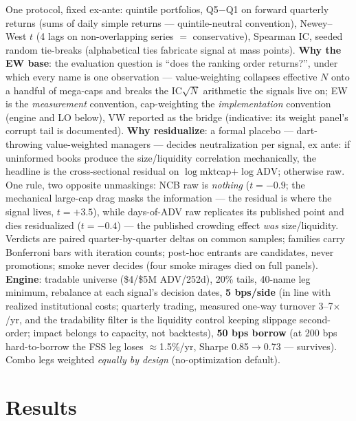 \documentclass[10pt]{article}
\begin{document}
One protocol, fixed ex-ante: quintile portfolios, Q5$-$Q1 on forward
quarterly returns (sums of daily simple returns ---
quintile-neutral convention), Newey--West $t$ (4 lags on
non-overlapping series $=$ conservative), Spearman IC, seeded random
tie-breaks (alphabetical ties fabricate signal at mass points).
\textbf{Why the EW base}: the evaluation question is ``does the
ranking order returns?'', under which every name is one observation
--- value-weighting collapses effective $N$ onto a handful of
mega-caps and breaks the $\mathrm{IC}\sqrt{N}$ arithmetic the
signals live on; EW is the \emph{measurement} convention,
cap-weighting the \emph{implementation} convention (engine and LO
below), VW reported as the bridge (indicative: its weight panel's
corrupt tail is documented). \textbf{Why residualize}: a formal
placebo --- dart-throwing value-weighted managers --- decides
neutralization per signal, ex ante: if uninformed books produce the
size/liquidity correlation mechanically, the headline is the
cross-sectional residual on $\log$mktcap$+\log$ADV; otherwise raw.
One rule, two opposite unmaskings: NCB raw is \emph{nothing}
($t=-0.9$; the mechanical large-cap drag masks the information ---
the residual is where the signal lives, $t=+3.5$), while days-of-ADV
raw replicates its published point and dies residualized ($t=-0.4$)
--- the published crowding effect \emph{was} size/liquidity.
Verdicts are paired quarter-by-quarter deltas on common samples;
families carry Bonferroni bars with iteration counts; post-hoc
entrants are candidates, never promotions; smoke never decides (four
smoke mirages died on full panels). \textbf{Engine}: tradable universe
(\$4/\$5M ADV/252d), 20\% tails, 40-name leg minimum, rebalance at
each signal's decision dates, \textbf{5 bps/side} (in line with
realized institutional costs; quarterly trading, measured one-way
turnover 3--7$\times$/yr, and the tradability filter is the
liquidity control keeping slippage second-order; impact belongs to
capacity, not backtests), \textbf{50 bps borrow} (at 200 bps
hard-to-borrow the FSS leg loses $\approx$1.5\%/yr, Sharpe
0.85$\to$0.73 --- survives). Combo legs weighted \emph{equally by
design} (no-optimization default).

\section{Results}
\end{document}
